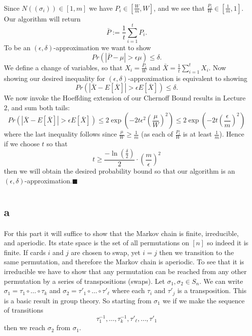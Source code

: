 \documentclass[letterpaper,12pt,oneside,onecolumn]{article}
\begin{document}
	\paragraph{}
	Since $N((\sigma_i))\in [1,m]$ we have $P_i \in [\frac{W}{m}, W]$, and we see that $\frac{P_i}{W} \in [\frac{1}{m}, 1]$. Our algorithm will return
	$$\bar{P} := \frac{1}{t} \sum_{i=1}^t P_i.$$
	To be an $(\epsilon,\delta)$-approximation we want to show
	$$Pr(|\bar{P} - \mu|> \epsilon\mu) \leq \delta.$$
	We define a change of variables, so that $X_i =\frac{P_i}{W}$ and $\bar{X} = \frac{1}{t}\sum_{i=1}^t X_i$. Now showing our desired inequality for $(\epsilon,\delta)$-approximation is equivalent to showing
	$$Pr(|\bar{X} - E[\bar{X}]| > \epsilon E[\bar{X}]) \leq \delta.$$
	We now invoke the Hoeffding extension of our Chernoff Bound results in Lecture $2$, and sum both tails:
	$$Pr(|\bar{X} - E[\bar{X}]| > \epsilon E[\bar{X}]) \leq 2\exp(-2t\epsilon^2(\frac{\mu}{W})^2) \leq 2\exp(-2t(\frac{\epsilon}{m})^2) $$
	where the last inequality follows since $\frac{\mu}{W} \geq \frac{1}{m}$ (as each of $\frac{P_i}{W}$ is at least $\frac{1}{m}$).
	Hence if we choose $t$ so that
	$$t \geq \frac{-\ln(\frac{\delta}{2})}{2} \cdot (\frac{m}{\epsilon})^2$$
	then we will obtain the desired probability bound so that our algorithm is an $(\epsilon,\delta)$-approximation.$\blacksquare$
	\newpage
	\section{}
	\subsection{a}
	\paragraph{}
	For this part it will suffice to show that the Markov chain is finite, irreducible, and aperiodic. Its state space is the set of all permutations on $[n]$ so indeed it is finite. If cards $i$ and $j$ are chosen to swap, yet $i=j$ then we transition to the same permutation, and therefore the Markov chain is aperiodic. To see that it is irreducible we have to show that any permutation can be reached from any other permutation by a series of transpositions (swaps). Let $\sigma_1, \sigma_2 \in S_n$. We can write $\sigma_1 = \tau_1 \circ \dots \circ \tau_k$ and $\sigma_2 = \tau'_1 \circ \dots \circ \tau'_\ell$ where each $\tau_i$ and $\tau'_j$ is a transposition. This is a basic result in group theory. So starting from $\sigma_1$ we if we make the sequence of transitions 
	$$\tau_1^{-1}, \dots, \tau_k^{-1},\tau'_\ell, \dots, \tau'_1$$
	then we reach $\sigma_2$ from $\sigma_1$.
\end{document}
